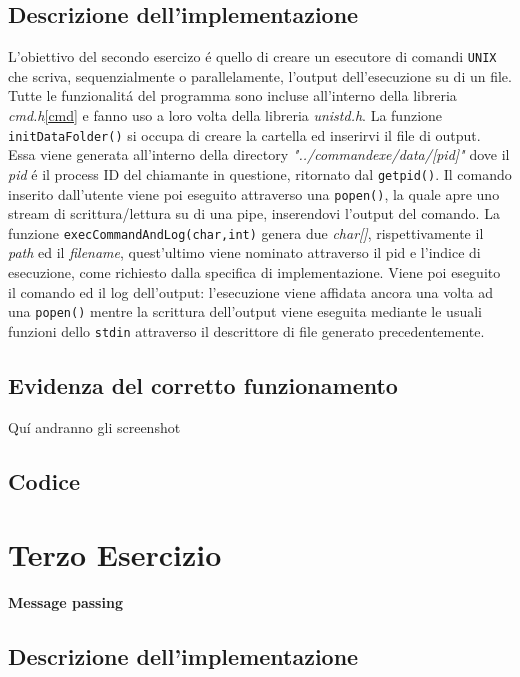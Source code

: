 \documentclass[a4paper]{article}
\begin{document}
\subsection{Descrizione dell'implementazione}
L'obiettivo del secondo esercizo \'e quello di creare un esecutore di comandi \texttt{UNIX} che scriva, sequenzialmente o parallelamente, l'output dell'esecuzione su di un file. \\
Tutte le funzionalit\'a del programma sono incluse all'interno della libreria \textit{cmd.h}\ref{cmd} e fanno uso a loro volta della libreria \textit{unistd.h}.
La funzione \texttt{initDataFolder()} si occupa di creare la cartella ed inserirvi il file di output. Essa viene generata all'interno della directory \textit{"../commandexe/data/[pid]"} dove il \textit{pid} \'e il process ID del chiamante in questione, ritornato dal \texttt{getpid()}.
Il comando inserito dall'utente viene poi eseguito attraverso una \texttt{popen()}, la quale apre uno stream di scrittura/lettura su di una pipe, inserendovi l'output del comando.
La funzione \texttt{execCommandAndLog(char,int)} genera due \textit{char[]}, rispettivamente il \textit{path} ed il \textit{filename}, quest'ultimo viene nominato attraverso il pid e l'indice di esecuzione, come richiesto dalla specifica di implementazione.
Viene poi eseguito il comando ed il log dell'output: l'esecuzione viene affidata ancora una volta ad una \texttt{popen()} mentre la scrittura dell'output viene eseguita mediante le usuali funzioni dello \texttt{stdin} attraverso il descrittore di file generato precedentemente.
\subsection{Evidenza del corretto funzionamento}
Qu\'i andranno gli screenshot
\subsection{Codice}



\newpage
\section{Terzo Esercizio}
\textbf{Message passing}
\subsection{Descrizione dell'implementazione}
\end{document}
